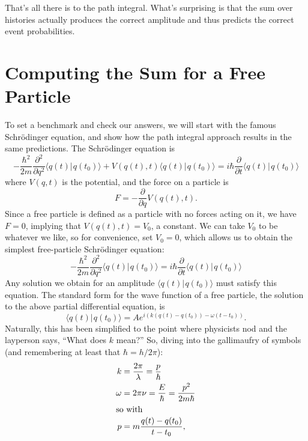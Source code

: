 \documentclass{amsart}
\newcommand{\mpderiv}[1]{\frac{\partial}{\partial {#1}}} %
\newcommand{\mnthpderiv}[2]{\frac{\partial^{#2}}{\partial {#1}^{#2}}} %
\newcommand{\ket}[1]{\vert \hspace{1pt}#1\rangle}
\newcommand{\braket}[2]{\langle #1 \ket{#2}}
\newcommand{\qv}{q}
\begin{document}
That's all there is to the path integral.  What's surprising is that the sum over histories actually produces the correct amplitude and thus predicts the correct event probabilities.

\section{Computing the Sum for a Free Particle}

To set a benchmark and check our answers, we will start with the famous Schr\"odinger equation, and show how the path integral approach results in the same predictions.  The Schr\"odinger equation is
\begin{equation*}
- \frac{\hbar^2}{2m}\mnthpderiv{\qv}{2} \braket{\qv(t)}{\qv(t_0)} + V(\qv(t), t) \braket{\qv(t)}{\qv(t_0)} = i \hbar \mpderiv{t}\braket{\qv(t)}{\qv(t_0)}
\end{equation*}
where $V(\qv, t)$ is the potential, and the force on a particle is 
\begin{equation*}
F = -\mpderiv{q}{V(\qv(t), t)}.
\end{equation*}
Since a free particle is defined as a particle with no forces acting on it, we have $F=0$, implying that $V(\qv(t),t) = V_0$, a constant.  We can take $V_0$ to be whatever we like, so for convenience, set $V_0 = 0$, which allows us to obtain the simplest free-particle Schr\"odinger equation:
\begin{equation*}
-\frac{\hbar^2}{2m}\mnthpderiv{\qv}{2}\braket{\qv(t)}{\qv(t_0)} = i \hbar \mpderiv{t}\braket{\qv(t)}{\qv(t_0)}
\end{equation*}
Any solution we obtain for an amplitude $\braket{\qv(t)}{\qv(t_0)}$ must satisfy this equation.  The standard form for the wave function of a free particle, the solution to the above partial differential equation, is
\begin{equation*}
\braket{\qv(t)}{\qv(t_0)} = A e^{ i (k (\qv(t) - \qv(t_0)) - \omega (t - t_0)) }.
\end{equation*}
Naturally, this has been simplified to the point where physicists nod and the layperson says, ``What does $k$ mean?''  So, diving into the gallimaufry of symbols (and remembering at least that $\hbar = h / 2 \pi$):
\begin{align*}
k &= \frac{2 \pi}{\lambda} = \frac{p}{\hbar}\\
\omega &= 2 \pi \nu = \frac{E}{\hbar} = \frac{p^2}{2 m \hbar}\\
\intertext{so with}
p &= m \frac{\qv(t) - \qv(t_0)}{t - t_0},
\end{align*}
\end{document}
